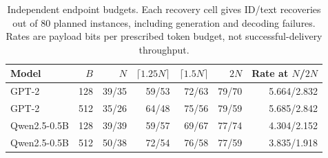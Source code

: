 \begin{table}[t]
\centering
\caption{Independent endpoint budgets. Each recovery cell gives ID/text recoveries out of 80 planned instances, including generation and decoding failures. Rates are payload bits per prescribed token budget, not successful-delivery throughput.}
\label{tab:upstream-budget}
\begin{tabular}{lrrrrrr}
\toprule
Model & $B$ & $N$ & $\lceil1.25N\rceil$ & $\lceil1.5N\rceil$ & $2N$ & Rate at $N$/$2N$ \\
\midrule
GPT-2 & 128 & 39/35 & 59/53 & 72/63 & 79/70 & 5.664/2.832 \\
GPT-2 & 512 & 35/26 & 64/48 & 75/56 & 79/59 & 5.685/2.842 \\
Qwen2.5-0.5B & 128 & 39/39 & 59/57 & 69/67 & 77/74 & 4.304/2.152 \\
Qwen2.5-0.5B & 512 & 50/38 & 72/54 & 76/58 & 77/59 & 3.835/1.918 \\
\bottomrule
\end{tabular}
\end{table}

